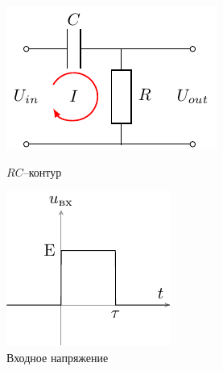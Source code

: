 \begin{figure}[h!]
\centering
\begin{minipage}{0.4\textwidth}
\centering
\includegraphics[width=\linewidth]{chem/task4}
\caption{$RC$--контур}
\label{fig:4figsA}
\end{minipage}
\qquad
\begin{minipage}{0.4\textwidth}
\centering
\includegraphics[width=\linewidth]{ris/task4_input}
\caption{Входное напряжение}
\label{fig:4figsB}
\end{minipage}
\end{figure}

